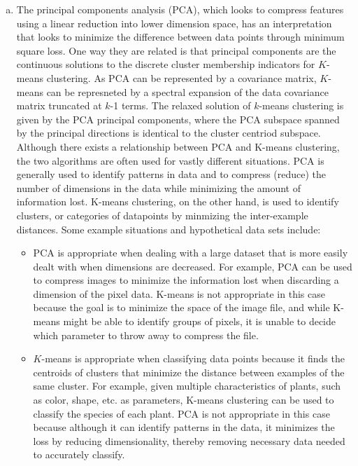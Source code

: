 \documentclass[11pt]{article}
\begin{document}
\begin{enumerate}[a.]
\item The principal components analysis (PCA), which looks to compress features using a linear reduction into lower dimension space, has an interpretation that looks to minimize the difference between data points through minimum square loss. One way they are related is that principal components are the continuous solutions to the discrete cluster membership indicators for $K$-means clustering. As PCA can be represented by a covariance matrix, $K$-means can be represneted by a spectral expansion of the data covariance matrix truncated at $k$-1 terms. The relaxed solution of $k$-means clustering is given by the PCA principal components, where the PCA subspace spanned by the principal directions is identical to the cluster centriod subspace.\\ \newline Although there exists a relationship between PCA and K-means clustering, the two algorithms are often used for vastly different situations. PCA is generally used to identify patterns in data and to compress (reduce) the number of dimensions in the data while minimizing the amount of information lost. K-means clustering, on the other hand, is used to identify clusters, or categories of datapoints by minmizing the inter-example distances.
Some example situations and hypothetical data sets include:
	\begin{itemize}
	\item PCA is appropriate when dealing with a large dataset that is more easily dealt with when dimensions are decreased. For example, PCA can be used to compress images to minimize the information lost when discarding a dimension of the pixel data. K-means is not appropriate in this case because the goal is to minimize the space of the image file, and while K-means might be able to identify groups of pixels, it is unable to decide which parameter to throw away to compress the file.
	\item $K$-means is appropriate when classifying data points because it finds the centroids of clusters that minimize the distance between examples of the same cluster. For example, given multiple characteristics of plants, such as color, shape, etc. as parameters, K-means clustering can be used to classify the species of each plant. PCA is not appropriate in this case because although it can identify patterns in the data, it minimizes the loss by reducing dimensionality, thereby removing necessary data needed to accurately classify.
	\end{itemize}
\end{enumerate}
\end{document}
